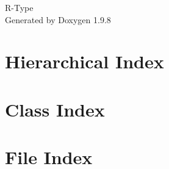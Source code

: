 \documentclass[twoside]{book}
\newcommand{\+}{\discretionary{\mbox{\scriptsize$\hookleftarrow$}}{}{}}
\newcommand{\clearemptydoublepage}{%
    \newpage{\pagestyle{empty}\cleardoublepage}%
  }
\begin{document}
  \raggedbottom
    \hypersetup{pageanchor=false,
                bookmarksnumbered=true,
                pdfencoding=unicode
               }
  \begin{titlepage}
  \vspace*{7cm}
  \begin{center}%
  {\Large R-\/\+Type}\\
  \vspace*{1cm}
  {\large Generated by Doxygen 1.9.8}\\
  \end{center}
  \end{titlepage}
  \clearemptydoublepage
  \tableofcontents
  \clearemptydoublepage
  \hypersetup{pageanchor=true}

\chapter{Hierarchical Index}

\chapter{Class Index}

\chapter{File Index}

\end{document}
